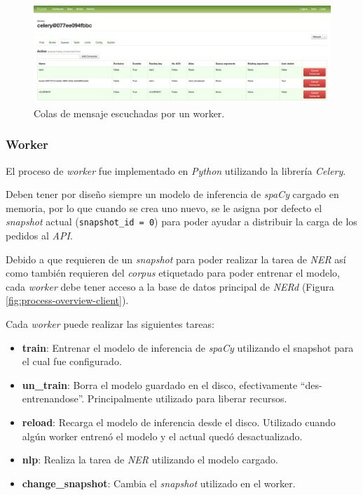 \documentclass[12pt,a4paper,]{scrartcl}
\providecommand{\tightlist}{%
  \setlength{\itemsep}{0pt}\setlength{\parskip}{0pt}}
\begin{document}
\begin{figure}[H]

{\centering \includegraphics{assets/developer/flower-worker-queues.png} 

}

\caption{Colas de mensaje escuchadas por un worker.}\label{fig:developer-flower-worker-queues}
\end{figure}

\hypertarget{worker-1}{%
\subsubsection{Worker}\label{worker-1}}

El proceso de \emph{worker} fue implementado en \emph{Python} utilizando la librería \emph{Celery}.

Deben tener por diseño siempre un modelo de inferencia de \emph{spaCy} cargado en memoria, por lo que cuando se crea uno nuevo, se le asigna por defecto el \emph{snapshot} actual (\texttt{snapshot\_id\ =\ 0}) para poder ayudar a distribuir la carga de los pedidos al \emph{API}.

Debido a que requieren de un \emph{snapshot} para poder realizar la tarea de \emph{NER} así como también requieren del \emph{corpus} etiquetado para poder entrenar el modelo, cada \emph{worker} debe tener acceso a la base de datos principal de \emph{NERd} (Figura \ref{fig:process-overview-client}).

Cada \emph{worker} puede realizar las siguientes tareas:

\begin{itemize}
\tightlist
\item
  \textbf{train}: Entrenar el modelo de inferencia de \emph{spaCy} utilizando el snapshot para el cual fue configurado.
\item
  \textbf{un\_train}: Borra el modelo guardado en el disco, efectivamente \enquote{des-entrenandose}. Principalmente utilizado para liberar recursos.
\item
  \textbf{reload}: Recarga el modelo de inferencia desde el disco. Utilizado cuando algún worker entrenó el modelo y el actual quedó desactualizado.
\item
  \textbf{nlp}: Realiza la tarea de \emph{NER} utilizando el modelo cargado.
\item
  \textbf{change\_snapshot}: Cambia el \emph{snapshot} utilizado en el worker.
\end{itemize}
\end{document}

